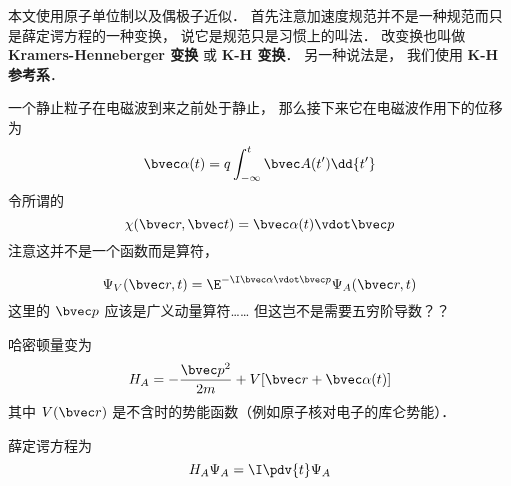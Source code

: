 
\begin{issues}
\issueDraft
\end{issues}


本文使用原子单位制以及偶极子近似． 首先注意加速度规范并不是一种规范而只是薛定谔方程的一种变换， 说它是规范只是习惯上的叫法． 改变换也叫做 \textbf{Kramers-Henneberger 变换} 或 \textbf{K-H 变换}． 另一种说法是， 我们使用 \textbf{K-H 参考系}．

一个静止粒子在电磁波到来之前处于静止， 那么接下来它在电磁波作用下的位移为
\begin{equation}
\bvec \alpha(t) = q\int_{-\infty}^t \bvec A(t') \dd{t'}
\end{equation}
令所谓的
\begin{equation}
\chi(\bvec r, \bvec t) = \bvec \alpha(t) \vdot \bvec p
\end{equation}
注意这并不是一个函数而是算符， 

\begin{equation}
\Psi_V(\bvec r, t) = \E^{-\I \bvec \alpha \vdot \bvec p} \Psi_A(\bvec r, t)
\end{equation}
这里的 $\bvec p$ 应该是广义动量算符…… 但这岂不是需要五穷阶导数？？

哈密顿量变为
\begin{equation}
H_A = -\frac{\bvec p^2}{2m} + V[\bvec r + \bvec \alpha(t)]
\end{equation}
其中 $V(\bvec r)$ 是不含时的势能函数（例如原子核对电子的库仑势能）．

薛定谔方程为
\begin{equation}
H_A \Psi_A = \I \pdv{t} \Psi_A
\end{equation}
